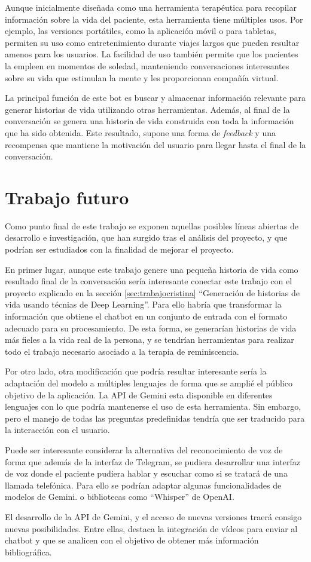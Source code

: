 Aunque inicialmente diseñada como una herramienta terapéutica para recopilar información sobre la vida del paciente, esta herramienta tiene múltiples usos. Por ejemplo, las versiones portátiles, como la aplicación móvil o para tabletas, permiten su uso como entretenimiento durante viajes largos que pueden resultar amenos para los usuarios. La facilidad de uso también permite que los pacientes la empleen en momentos de soledad, manteniendo conversaciones interesantes sobre su vida que estimulan la mente y les proporcionan compañía virtual.

La principal función de este bot es buscar y almacenar información relevante para generar historias de vida utilizando otras herramientas. Además, al final de la conversación se genera una historia de vida construida con toda la información que ha sido obtenida. Este resultado, supone una forma de \textit{feedback} y una recompensa que mantiene la motivación del usuario para llegar hasta el final de la conversación. 

\section{Trabajo futuro}

Como punto final de este trabajo se exponen aquellas posibles líneas abiertas de desarrollo e investigación, que han surgido tras el análisis del proyecto, y que podrían ser estudiados con la finalidad de mejorar el proyecto. 

En primer lugar, aunque este trabajo genere una pequeña historia de vida como resultado final de la conversación sería interesante conectar este trabajo con el proyecto explicado en la sección \ref{sec:trabajocristina} ``Generación de historias de vida usando técnias de Deep Learning''. Para ello habría que transformar la información que obtiene el chatbot en un conjunto de entrada con el formato adecuado para su procesamiento. De esta forma, se generarían historias de vida más fieles a la vida real de la persona, y se tendrían herramientas para realizar todo el trabajo necesario asociado a la terapia de reminiscencia. 

Por otro lado, otra modificación que podría resultar interesante sería la adaptación del modelo a múltiples lenguajes de forma que se amplié el público objetivo de la aplicación. La API de Gemini esta disponible en diferentes lenguajes con lo que podría mantenerse el uso de esta herramienta. Sin embargo, pero el manejo de todas las preguntas predefinidas tendría que ser traducido para la interacción con el usuario. 

Puede ser interesante considerar la alternativa del reconocimiento de voz de forma que además de la interfaz de Telegram, se pudiera desarrollar una interfaz de voz donde el paciente pudiera hablar y escuchar como si se tratará de una llamada telefónica. Para ello se podrían adaptar algunas funcionalidades de modelos de Gemini. o bibliotecas como ``Whisper'' de OpenAI.

El desarrollo de la API de Gemini, y el acceso de nuevas versiones traerá consigo nuevas posibilidades. Entre ellas, destaca la integración de vídeos para enviar al chatbot y que se analicen con el objetivo de obtener más información bibliográfica.
